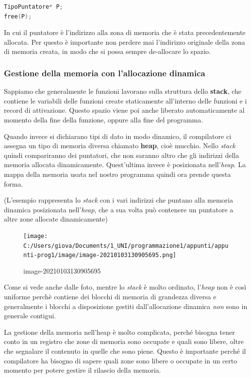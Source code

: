 \documentclass[
  paper=a4,
  oneside  ,captions=tableheading
]{scrbook}
\begin{document}
\begin{lstlisting}[language=C]
TipoPuntatore* P;
free(P);
\end{lstlisting}

In cui il puntatore è l'indirizzo alla zona di memoria che è stata
precedentemente allocata. Per questo è importante non perdere mai
l'indirizzo originale della zona di memoria creata, in modo che si possa
sempre de-allocare lo spazio.

\hypertarget{gestione-della-memoria-con-lallocazione-dinamica}{%
\subsubsection{Gestione della memoria con l'allocazione
dinamica}\label{gestione-della-memoria-con-lallocazione-dinamica}}

Sappiamo che generalmente le funzioni lavorano sulla struttura dello
\textbf{stack}, che contiene le variabili delle funzioni create
staticamente all'interno delle funzioni e i record di attivazione.
Questo spazio viene poi anche liberato automaticamente al momento della
fine della funzione, oppure alla fine del programma.

Quando invece si dichiarano tipi di dato in modo dinamico, il
compilatore ci assegna un tipo di memoria diversa chiamato
\textbf{heap}, cioè mucchio. Nello \emph{stack} quindi compariranno dei
puntatori, che non saranno altro che gli indirizzi della memoria
allocata dinamicamente. Quest'ultima invece è posizionata
nell'\emph{heap}. La mappa della memoria usata nel nostro programma
quindi ora prende questa forma.

(L'esempio rappresenta lo \emph{stack} con i vari indirizzi che puntano
alla memoria dinamica posizionata nell'\emph{heap}, che a sua volta può
contenere un puntatore a altre zone allocate dinamicamente)

\begin{figure}
\centering
\texttt{[image: C:/Users/giova/Documents/1\_UNI/programmazione1/appunti/appunti-prog1/image/image-20210103130905695.png]}
\caption{image-20210103130905695}
\end{figure}

Come si vede anche dalle foto, mentre lo \emph{stack} è molto ordinato,
l'\emph{heap} non è così uniforme perchè contiene dei blocchi di memoria
di grandezza diversa e generalmente i blocchi a disposizione gestiti
dall'allocazione dinamica \emph{non} sono in generale contigui.

La gestione della memoria nell'heap è molto complicata, perché bisogna
tener conto in un registro che zone di memoria sono occupate e quali
sono libere, oltre che segnalare il contenuto in quelle che sono piene.
Questo è importante perché il compilatore ha bisogno di sapere quali
zone sono libere o occupate in un certo momento per potere gestire il
rilascio della memoria.
\end{document}

